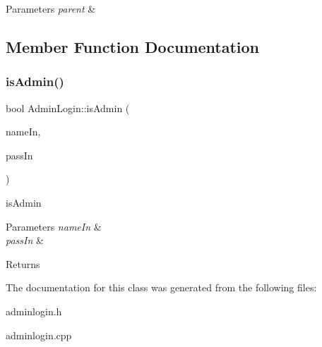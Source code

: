 \begin{DoxyParams}{Parameters}
{\em parent} & \\
\hline
\end{DoxyParams}


\subsection{Member Function Documentation}
\mbox{\label{class_admin_login_a7b096251d552fafeae34a229e748398c}} 
\subsubsection{\texorpdfstring{is\+Admin()}{isAdmin()}}
{\footnotesize\ttfamily bool Admin\+Login\+::is\+Admin (\begin{DoxyParamCaption}\item[{Q\+String}]{name\+In,  }\item[{Q\+String}]{pass\+In }\end{DoxyParamCaption})}



is\+Admin 


\begin{DoxyParams}{Parameters}
{\em name\+In} & \\
\hline
{\em pass\+In} & \\
\hline
\end{DoxyParams}
\begin{DoxyReturn}{Returns}

\end{DoxyReturn}


The documentation for this class was generated from the following files\+:\begin{DoxyCompactItemize}
\item 
adminlogin.\+h\item 
adminlogin.\+cpp\end{DoxyCompactItemize}
